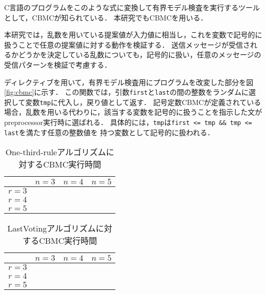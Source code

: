 \documentclass[technicalreport]{ieicej}
\theoremstyle{plain}
\begin{document}
C言語のプログラムをこのような式に変換して有界モデル検査を実行するツールとして，CBMCが知られている\cite{ckl2004}．
本研究でもCBMCを用いる．

本研究では，乱数を用いている提案値が入力値に相当し，これを変数で記号的に扱うことで任意の提案値に対する動作を検証する．
送信メッセージが受信されるかどうかを決定している乱数についても，記号的に扱い，任意のメッセージの受信パターンを検証で考慮する．

ディレクティブを用いて，有界モデル検査用にプログラムを改変した部分を図\ref{fig:cbmc}に示す．
この関数では，引数\verb|first|と\verb|last|の間の整数をランダムに選択して変数\verb|tmp|に代入し，戻り値として返す．
記号定数CBMCが定義されている場合，乱数を用いる代わりに，該当する変数を記号的に扱うことを指示した文が
preprocessor実行時に選ばれる．
具体的には，\verb|tmp|は\verb|first <= tmp && tmp <= last|を満たす任意の整数値を
持つ変数として記号的に扱われる．

\begin{table}
    \centering
    \caption{One-third-ruleアルゴリズムに対するCBMC実行時間}\label{tab:onethird}
    \begin{tabular}{cccc}
        \hline
                &  $n=3$ & $n = 4$ & $n = 5$ \\ \hline
       $r = 3$ &    &    &     \\ 
       $r = 4$ &    &    &     \\ 
       $r = 5$ &    &    &     \\ 
       
       \hline

    \end{tabular}
\end{table}
\begin{table}
    \centering
    \caption{LastVotingアルゴリズムに対するCBMC実行時間}\label{tab:lastvoting}
    \begin{tabular}{cccc}
        \hline
        &  $n=3$ & $n = 4$ & $n = 5$ \\ \hline
        $r = 3$ &    &    &     \\ 
        $r = 4$ &    &    &     \\ 
        $r = 5$ &    &    &     \\ 
        
        \hline
        
    \end{tabular}
\end{table}
%
\end{document}
